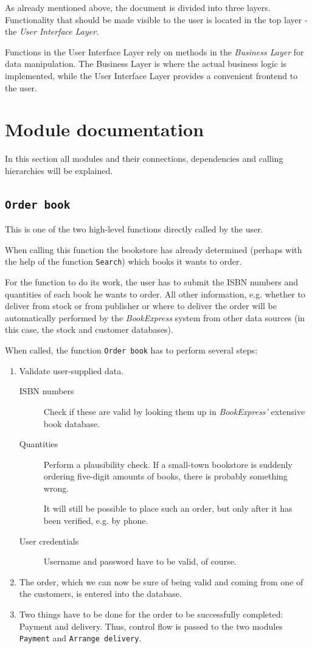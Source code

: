 As already mentioned above, the document is divided into three layers. Functionality that should be made visible to the user is located in the top layer - the \emph{User Interface Layer}.

Functions in the User Interface Layer rely on methods in the \emph{Business Layer} for data manipulation. The Business Layer is where the actual business logic is implemented, while the User Interface Layer provides a convenient frontend to the user.
\chapter{Module documentation}
In this section all modules and their connections, dependencies and calling hierarchies will be explained.

\section{\texttt{Order book}}
This is one of the two high-level functions directly called by the user.

When calling this function the bookstore has already determined (perhaps with the help of the function \texttt{Search})
which books it wants to order.

For the function to do its work, the user has to submit the ISBN numbers and quantities of each book he wants to order.
All other information, e.g. whether to deliver from stock or from publisher or where to deliver the order will be automatically
performed by the \emph{BookExpress} system from other data sources (in this case, the stock and customer databases).

When called, the function \texttt{Order book} has to perform several steps:
\begin{enumerate}
	\item Validate user-supplied data.

		  \begin{description}
		  	\item[ISBN numbers] Check if these are valid by looking them up in \emph{BookExpress'} extensive book database.
			\item[Quantities]   Perform a plausibility check. If a small-town bookstore is suddenly ordering five-digit amounts of books,
			                    there is probably something wrong.

								It will still be possible to place such an order, but only after it has been verified, e.g. by phone.
			\item[User credentials] Username and password have to be valid, of course.
		  \end{description}
   \item The order, which we can now be sure of being valid and coming from one of the customers, is entered into the database.
   \item Two things have to be done for the order to be successfully completed: Payment and delivery. Thus, control flow is passed to the
         two modules \texttt{Payment} and \texttt{Arrange delivery}.
\end{enumerate}

